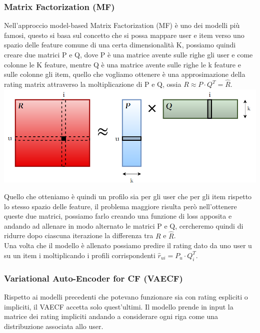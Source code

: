 \subsubsection{Matrix Factorization (MF)}
Nell'approccio model-based Matrix Factorization (MF) è uno dei modelli più famosi, questo si basa sul concetto che si possa mappare user e item verso uno spazio delle feature comune di una certa dimensionalità K, possiamo quindi creare due matrici P e Q, dove P è una matrice avente sulle righe gli user e come colonne le K feature, mentre Q è una matrice avente sulle righe le k feature e sulle colonne gli item, quello che vogliamo ottenere è una approsimazione della rating matrix attraverso la moltiplicazione di P e Q, ossia $R \approx P \cdot Q^{T} = \hat{R}$.\\
\includegraphics[width=14.5cm]{figures/MF_disegno}

Quello che otteniamo è quindi un profilo sia per gli user che per gli item rispetto lo stesso spazio delle feature, il problema maggiore risulta però nell'ottenere queste due matrici, possiamo farlo creando una funzione di loss apposita e andando ad allenare in modo alternato le matrici P e Q, cercheremo quindi di ridurre dopo ciascuna iterazione la differenza tra $R$ e $\hat{R}$.\\
Una volta che il modello è allenato possiamo predire il rating dato da uno user u su un item i moltiplicando i profili corrispondenti $\hat{r}_{ui} = P_u \cdot Q_{i}^{T}$.

\subsubsection{Variational Auto-Encoder for CF (VAECF)}
Rispetto ai modelli precedenti che potevano funzionare sia con rating espliciti o impliciti, il VAECF accetta solo quest'ultimi. Il modello prende in input la matrice dei rating impliciti andando a considerare ogni riga come una distribuzione associata allo user.

